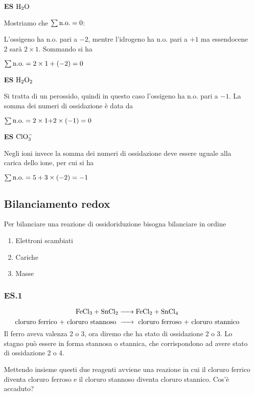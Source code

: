 \begin{itemize}[leftmargin=0.5cm]
  \textbf{ES} $\rm H_2O$

  Mostriamo che $\sum \rm n.o.=0$:

  L'ossigeno ha n.o. pari a $-2$, mentre l'idrogeno ha n.o. pari a $+1$ ma essendocene 2 sarà $2 \times 1$. Sommando si ha
  \begin{center}
    $\sum \rm n.o. = 2\times 1+(-2)=0$
  \end{center}

  \textbf{ES} $\rm H_2O_2$

  Si tratta di un perossido, quindi in questo caso l'ossigeno ha n.o. pari a $-1$. La somma dei numeri di ossidazione è data da
  \begin{center}
    $\sum \rm n.o.=2 \times \text{1+2} \times (-1)=0$
  \end{center}

  \textbf{ES} $\rm ClO_3^-$

  Negli ioni invece la somma dei numeri di ossidazione deve essere uguale alla carica dello ione, per cui si ha
  \begin{center}
  $\sum \rm n.o. = 5+3 \times (-2)=-1$
  \end{center}

\end{itemize}

\newpage
\subsection{Bilanciamento redox}
Per bilanciare una reazione di ossidoriduzione bisogna bilanciare in ordine
\begin{enumerate}
    \item Elettroni scambiati
    \item Cariche
    \item Masse
  \end{enumerate}
\subsubsection{\textbf{ES.1}}
$$\ce{FeCl_3 + SnCl_2 -> FeCl_2 + SnCl_4}$$
$$\text{cloruro ferrico + cloruro stannoso \ce{->} cloruro ferroso + cloruro stannico}$$
Il ferro aveva valenza 2 o 3, ora diremo che ha stato di ossidazione 2 o 3. Lo stagno può essere in forma stannosa o stannica, che corrispondono ad avere stato di ossidazione 2 o 4.

Mettendo insieme questi due reagenti avviene una reazione in cui il cloruro ferrico diventa cloruro ferroso e il cloruro stannoso diventa cloruro stannico. Cos'è accaduto?

